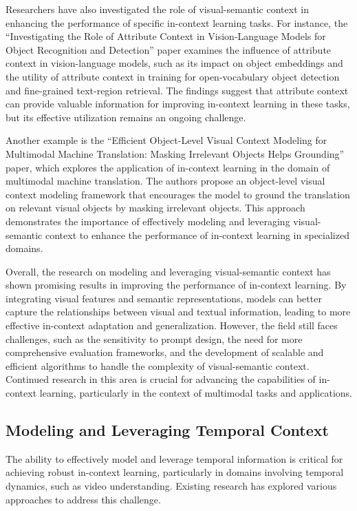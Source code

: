 \documentclass[11pt]{article}
\begin{document}
Researchers have also investigated the role of visual-semantic context in enhancing the performance of specific in-context learning tasks. For instance, the ``Investigating the Role of Attribute Context in Vision-Language Models for Object Recognition and Detection'' \cite{ref149} paper examines the influence of attribute context in vision-language models, such as its impact on object embeddings and the utility of attribute context in training for open-vocabulary object detection and fine-grained text-region retrieval. The findings suggest that attribute context can provide valuable information for improving in-context learning in these tasks, but its effective utilization remains an ongoing challenge.

Another example is the ``Efficient Object-Level Visual Context Modeling for Multimodal Machine Translation: Masking Irrelevant Objects Helps Grounding'' \cite{ref150} paper, which explores the application of in-context learning in the domain of multimodal machine translation. The authors propose an object-level visual context modeling framework that encourages the model to ground the translation on relevant visual objects by masking irrelevant objects. This approach demonstrates the importance of effectively modeling and leveraging visual-semantic context to enhance the performance of in-context learning in specialized domains.

Overall, the research on modeling and leveraging visual-semantic context has shown promising results in improving the performance of in-context learning. By integrating visual features and semantic representations, models can better capture the relationships between visual and textual information, leading to more effective in-context adaptation and generalization. However, the field still faces challenges, such as the sensitivity to prompt design, the need for more comprehensive evaluation frameworks, and the development of scalable and efficient algorithms to handle the complexity of visual-semantic context. Continued research in this area is crucial for advancing the capabilities of in-context learning, particularly in the context of multimodal tasks and applications.

\subsection{Modeling and Leveraging Temporal Context}

The ability to effectively model and leverage temporal information is critical for achieving robust in-context learning, particularly in domains involving temporal dynamics, such as video understanding. Existing research has explored various approaches to address this challenge.
\end{document}
